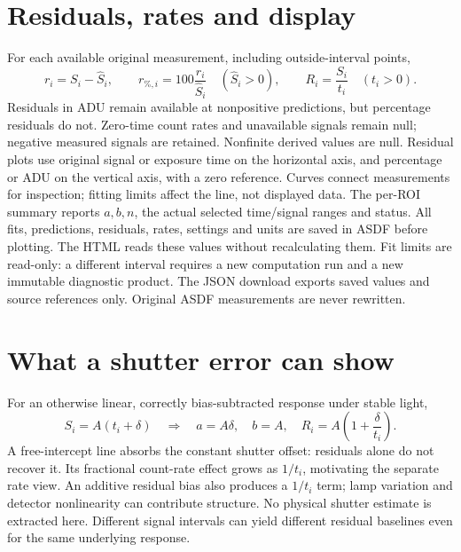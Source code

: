 \documentclass[10pt,a4paper]{article}
\begin{document}
\section{Residuals, rates and display}
For each available original measurement, including outside-interval points,
\[
 r_i=S_i-\widehat S_i,\qquad
 r_{\%,i}=100\frac{r_i}{\widehat S_i}\quad(\widehat S_i>0),\qquad
 R_i=\frac{S_i}{t_i}\quad(t_i>0).
\]
Residuals in ADU remain available at nonpositive predictions, but percentage
residuals do not. Zero-time count rates and unavailable signals remain null;
negative measured signals are retained. Nonfinite derived values are null.
Residual plots use original signal or exposure time on the horizontal axis, and
percentage or ADU on the vertical axis, with a zero reference. Curves connect
measurements for inspection; fitting limits affect the line, not displayed data.
The per-ROI summary reports $a,b,n$, the actual selected time/signal ranges and
status. All fits, predictions, residuals, rates, settings and units are saved in ASDF before plotting. The HTML reads these values without recalculating them. Fit limits are read-only: a different interval requires a new computation run and a new immutable diagnostic product. The JSON download exports saved values and source references only. Original ASDF measurements are never rewritten.

\section{What a shutter error can show}
For an otherwise linear, correctly bias-subtracted response under stable light,
\[
 S_i=A(t_i+\delta)\quad\Longrightarrow\quad a=A\delta,\quad b=A,
 \quad R_i=A\left(1+\frac{\delta}{t_i}\right).
\]
A free-intercept line absorbs the constant shutter offset: residuals alone do not
recover it. Its fractional count-rate effect grows as $1/t_i$, motivating the
separate rate view. An additive residual bias also produces a $1/t_i$ term;
lamp variation and detector nonlinearity can contribute structure. No physical
shutter estimate is extracted here. Different signal intervals can yield different
residual baselines even for the same underlying response.
\end{document}
